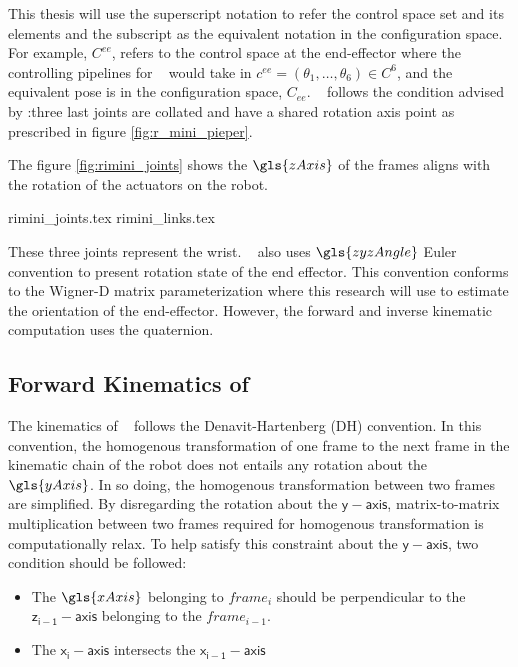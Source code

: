 This thesis
will use the superscript notation to refer the control space set and its elements and the 
subscript as the equivalent notation in the configuration space.
For example, $C^{ee}$, refers to the control space at the end-effector
where the controlling pipelines for \rimini~ would take in
$c^{ee} = (\theta_{1},\ldots,\theta_{6}) \in C^{6}$, 
and the equivalent pose is in the configuration space, $C_{ee}$.
\rimini~ follows the condition advised by \textcite{Pieper1968}
:three last joints are collated and have a shared rotation axis point as
prescribed in figure \ref{fig:r_mini_pieper}.

The figure \ref{fig:rimini_joints} shows the $\gls{zAxis}$ of 
the frames aligns with the rotation of the actuators on the robot. 

{rimini_joints.tex} %
{rimini_links.tex} %

These three joints represent the wrist. 
\rimini~ also uses $\gls{zyzAngle}$ Euler convention to present rotation state
of the end effector. This convention conforms
to the Wigner-D matrix parameterization where this 
research will use to estimate the orientation of 
the end-effector. However, the forward and inverse 
kinematic computation uses the quaternion.

\subsection{Forward Kinematics of \rimini~}\label{sec:fk_rimini}
The kinematics of \rimini~ follows the Denavit-Hartenberg (DH) convention. 
In this convention, the homogenous transformation of one frame to the next frame
in the kinematic chain of the robot does not entails any rotation about the $\gls{yAxis}$.
In so doing, the homogenous transformation between two frames are simplified. By disregarding
the rotation about the $\mathsf{y-axis}$, matrix-to-matrix multiplication between two frames required 
for homogenous transformation is computationally relax. To help satisfy this constraint 
about the $\mathsf{y-axis}$, two condition should be followed:

\begin{itemize}
  \item The $\gls{xAxis}$ belonging to $frame_i$ should be perpendicular to the 
    $\mathsf{z_{i-1}-axis}$
    belonging to the $frame_{i-1}$.
  \item The $\mathsf{x_i-axis}$ intersects the $\mathsf{x_{i-1}-axis}$
\end{itemize}

